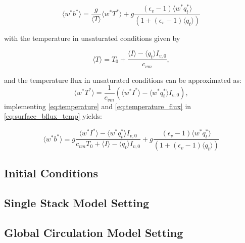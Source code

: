 \documentclass{report}
\begin{document}
\begin{equation}
\langle w^*b^* \rangle = \frac{g}{\langle T \rangle} \langle w^*T^* \rangle + 
g\frac{(\epsilon_v-1) \langle w^*q_t^* \rangle}{(1+(\epsilon_v-1)\langle q_t \rangle)}
    \label{eq:surface_bflux_temp} 
\end{equation}

with the temperature in unsaturated conditions given by 

\begin{equation}
    \langle T \rangle = T_0 + \frac{\langle I \rangle - \langle q_t \rangle I_{v,0}}{c_{vm}},
    \label{eq:temperature}
\end{equation}

and the temperature flux in unsaturated conditions can be approximated as:
\begin{equation}
    \langle w^*T^* \rangle = \frac{1}{c_{vm}}(\langle w^*I^* \rangle  - \langle w^*q_t^* \rangle I_{v,0}),
    \label{eq:temperature_flux}
\end{equation}
implementing \eqref{eq:temperature} and  \eqref{eq:temperature_flux}
in \eqref{eq:surface_bflux_temp} yields:

\begin{equation}
\langle w^*b^* \rangle =g \frac{\langle w^*I^* \rangle  - \langle w^*q_t^* \rangle I_{v,0}}{c_{vm}T_0 + \langle I \rangle - \langle q_t \rangle I_{v,0}} +
g\frac{(\epsilon_v-1) \langle w^*q_t^* \rangle}{(1+(\epsilon_v-1)\langle q_t \rangle)}
    \label{eq:surface_bflux}     
\end{equation}


 \subsection{Initial Conditions} \label{sec:Initial Conditions}


\subsection{Single Stack Model Setting} \label{sec:Single Stack setting}


\subsection{Global Circulation Model Setting} \label{sec:Global Circulation Model Setting}

\appendix
\end{document}

